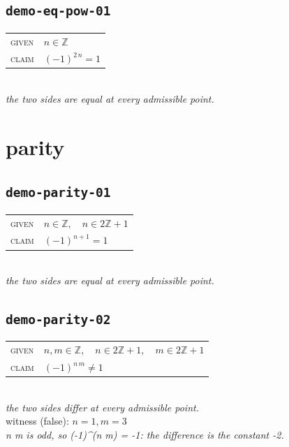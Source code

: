 \documentclass[11pt]{article}
\begin{document}
\subsection*{\texttt{demo-eq-pow-01}}
\begin{tabular}{@{}l@{\quad}l@{}}
\textsc{given} & $n \in \mathbb{Z}$ \\[4pt]
\textsc{claim} & $\displaystyle \left(-1\right)^{2 \, n} = 1$ \\
\end{tabular}\\[2pt]
{\small\emph{the two sides are equal at every admissible point.}}\\

\section*{parity}
\subsection*{\texttt{demo-parity-01}}
\begin{tabular}{@{}l@{\quad}l@{}}
\textsc{given} & $n \in \mathbb{Z},\quad n \in 2\mathbb{Z} + 1$ \\[4pt]
\textsc{claim} & $\displaystyle \left(-1\right)^{n + 1} = 1$ \\
\end{tabular}\\[2pt]
{\small\emph{the two sides are equal at every admissible point.}}\\

\subsection*{\texttt{demo-parity-02}}
\begin{tabular}{@{}l@{\quad}l@{}}
\textsc{given} & $n, m \in \mathbb{Z},\quad n \in 2\mathbb{Z} + 1,\quad m \in 2\mathbb{Z} + 1$ \\[4pt]
\textsc{claim} & $\displaystyle \left(-1\right)^{n \, m} \neq 1$ \\
\end{tabular}\\[2pt]
{\small\emph{the two sides differ at every admissible point.}}\\
{\footnotesize\color{gray}witness (false): $n = 1, m = 3$}\\
\emph{n m is odd, so (-1)\textasciicircum{}(n m) = -1: the difference is the constant -2.}\\
\end{document}
